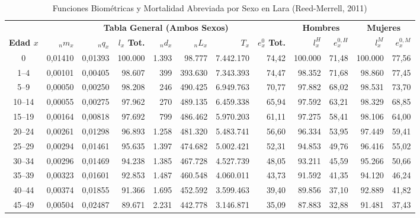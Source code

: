 \documentclass[12pt,letterpaper]{article}
\begin{document}
\begin{table}[htbp]
    \centering
    \caption{Funciones Biométricas y Mortalidad Abreviada por Sexo en Lara (Reed-Merrell, 2011)}
    \label{tab:vida_lara}
    \scriptsize
    \setlength{\tabcolsep}{2.5pt}
    \begin{tabular*}{\textwidth}{@{\extracolsep{\fill}}crrrrrrrrrrr}
        \toprule
        & \multicolumn{7}{c}{\textbf{Tabla General (Ambos Sexos)}} & \multicolumn{2}{c}{\textbf{Hombres}} & \multicolumn{2}{c}{\textbf{Mujeres}} \\
        \cmidrule(lr){2-8} \cmidrule(lr){9-10} \cmidrule(lr){11-12}
        \textbf{Edad $x$} & \textbf{${}_n m_x$} & \textbf{${}_n q_x$} & \textbf{$l_x$ Tot.} & \textbf{${}_n d_x$} & \textbf{${}_n L_x$} & \textbf{$T_x$} & \textbf{$e_x^0$ Tot.} & \textbf{$l_x^H$} & \textbf{$e_x^{0,H}$} & \textbf{$l_x^M$} & \textbf{$e_x^{0,M}$} \\
        \midrule
        0 & 0,01410 & 0,01393 & 100.000 & 1.393 & 98.777 & 7.442.170 & 74,42 & 100.000 & 71,48 & 100.000 & 77,56 \\
        1--4 & 0,00101 & 0,00405 & 98.607 & 399 & 393.630 & 7.343.393 & 74,47 & 98.352 & 71,68 & 98.860 & 77,45 \\
        5--9 & 0,00050 & 0,00250 & 98.208 & 246 & 490.425 & 6.949.763 & 70,77 & 97.882 & 68,02 & 98.531 & 73,70 \\
        10--14 & 0,00055 & 0,00275 & 97.962 & 270 & 489.135 & 6.459.338 & 65,94 & 97.592 & 63,21 & 98.329 & 68,85 \\
        15--19 & 0,00164 & 0,00818 & 97.692 & 799 & 486.462 & 5.970.203 & 61,11 & 97.275 & 58,41 & 98.106 & 64,00 \\
        20--24 & 0,00261 & 0,01298 & 96.893 & 1.258 & 481.320 & 5.483.741 & 56,60 & 96.334 & 53,95 & 97.449 & 59,41 \\
        25--29 & 0,00294 & 0,01461 & 95.635 & 1.397 & 474.682 & 5.002.421 & 52,31 & 94.853 & 49,76 & 96.416 & 55,02 \\
        30--34 & 0,00296 & 0,01469 & 94.238 & 1.385 & 467.728 & 4.527.739 & 48,05 & 93.211 & 45,59 & 95.266 & 50,66 \\
        35--39 & 0,00323 & 0,01601 & 92.853 & 1.487 & 460.548 & 4.060.011 & 43,73 & 91.592 & 41,35 & 94.120 & 46,24 \\
        40--44 & 0,00374 & 0,01855 & 91.366 & 1.695 & 452.592 & 3.599.463 & 39,40 & 89.856 & 37,10 & 92.889 & 41,82 \\
        45--49 & 0,00504 & 0,02487 & 89.671 & 2.231 & 442.778 & 3.146.871 & 35,09 & 87.883 & 32,88 & 91.481 & 37,43 \\

\end{tabular*}
\end{table}
\end{document}
